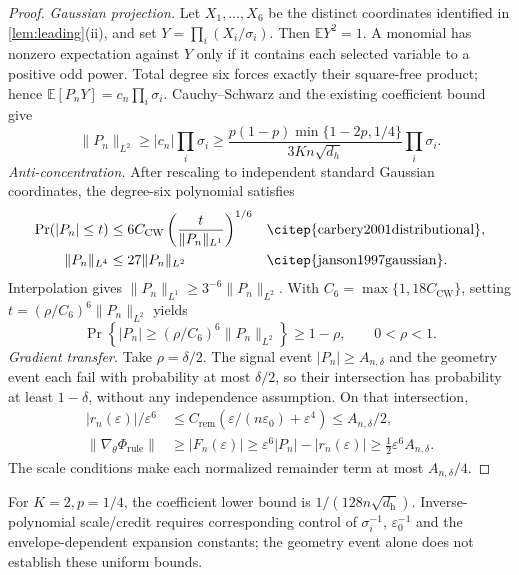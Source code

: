 \begin{proof}
\emph{Gaussian projection.} Let $X_1,\ldots,X_6$ be the distinct coordinates
identified in \cref{lem:leading}(ii), and set $Y=\prod_i(X_i/\sigma_i)$.
Then $\mathbb E Y^2=1$. A monomial has nonzero expectation against $Y$
only if it contains each selected variable to a positive odd power.
Total degree six forces exactly their square-free product; hence
$\mathbb E[P_nY]=c_n\prod_i\sigma_i$. Cauchy--Schwarz and the existing coefficient bound give
\begin{equation}\label{eq:quant-rule-L2}
 \|P_n\|_{L^2}\ge |c_n|\prod_i\sigma_i
 \ge\frac{p(1-p)\min\{1-2p,1/4\}}{3Kn\sqrt{d_h}}\prod_i\sigma_i.
\end{equation}
\emph{Anti-concentration.} After rescaling to independent standard Gaussian
coordinates, the degree-six polynomial satisfies
\begin{align*}
 \Pr(|P_n|\le t)&\le6C_{\mathrm{CW}}
 \left(\frac{t}{\|P_n\|_{L^1}}\right)^{1/6}
 &&\text{\citep{carbery2001distributional}},\\
 \|P_n\|_{L^4}&\le27\|P_n\|_{L^2}
 &&\text{\citep{janson1997gaussian}}.
\end{align*}
Interpolation gives $\|P_n\|_{L^1}\ge3^{-6}\|P_n\|_{L^2}$.
With $C_6=\max\{1,18C_{\mathrm{CW}}\}$, setting
$t=(\rho/C_6)^6\|P_n\|_{L^2}$ yields
\begin{equation}\label{eq:quant-rule-AC}
 \Pr\!\left\{|P_n|\ge(\rho/C_6)^6\|P_n\|_{L^2}\right\}\ge1-\rho,
 \qquad 0<\rho<1.
\end{equation}
\emph{Gradient transfer.} Take $\rho=\delta/2$. The signal event
$|P_n|\ge A_{n,\delta}$ and the geometry event each fail with probability
at most $\delta/2$, so their intersection has probability at least
$1-\delta$, without any independence assumption. On that intersection,
\begin{align*}
 |r_n(\varepsilon)|/\varepsilon^6
 &\le C_{\mathrm{rem}}(\varepsilon/(n\varepsilon_0)+\varepsilon^4)
 \le A_{n,\delta}/2,\\
 \|\nabla_\theta\Phi_{\mathrm{rule}}\|
 &\ge |F_n(\varepsilon)|\ge\varepsilon^6|P_n|-|r_n(\varepsilon)|
 \ge\tfrac12\varepsilon^6 A_{n,\delta}.
\end{align*}
The scale conditions make each normalized remainder term at most
$A_{n,\delta}/4$.
\end{proof}



For $K=2,p=1/4$, the coefficient lower bound is $1/(128n\sqrt{d_{\mathrm h}})$. Inverse-polynomial scale/credit
requires corresponding control of $\sigma_i^{-1}$, $\varepsilon_0^{-1}$
and the envelope-dependent expansion constants; the geometry event alone
does not establish these uniform bounds.

